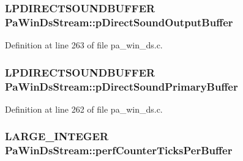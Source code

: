 \subsubsection[{\texorpdfstring{p\+Direct\+Sound\+Output\+Buffer}{pDirectSoundOutputBuffer}}]{\setlength{\rightskip}{0pt plus 5cm}L\+P\+D\+I\+R\+E\+C\+T\+S\+O\+U\+N\+D\+B\+U\+F\+F\+ER Pa\+Win\+Ds\+Stream\+::p\+Direct\+Sound\+Output\+Buffer}\hypertarget{struct_pa_win_ds_stream_a78946544af5046dd6ba8c723e849d1bb}{}\label{struct_pa_win_ds_stream_a78946544af5046dd6ba8c723e849d1bb}


Definition at line 263 of file pa\+\_\+win\+\_\+ds.\+c.

\subsubsection[{\texorpdfstring{p\+Direct\+Sound\+Primary\+Buffer}{pDirectSoundPrimaryBuffer}}]{\setlength{\rightskip}{0pt plus 5cm}L\+P\+D\+I\+R\+E\+C\+T\+S\+O\+U\+N\+D\+B\+U\+F\+F\+ER Pa\+Win\+Ds\+Stream\+::p\+Direct\+Sound\+Primary\+Buffer}\hypertarget{struct_pa_win_ds_stream_a722c711a49c112dd449a310021f6a434}{}\label{struct_pa_win_ds_stream_a722c711a49c112dd449a310021f6a434}


Definition at line 262 of file pa\+\_\+win\+\_\+ds.\+c.

\subsubsection[{\texorpdfstring{perf\+Counter\+Ticks\+Per\+Buffer}{perfCounterTicksPerBuffer}}]{\setlength{\rightskip}{0pt plus 5cm}L\+A\+R\+G\+E\+\_\+\+I\+N\+T\+E\+G\+ER Pa\+Win\+Ds\+Stream\+::perf\+Counter\+Ticks\+Per\+Buffer}\hypertarget{struct_pa_win_ds_stream_a039793c3d1d95db8711f1ae64a73ed9b}{}\label{struct_pa_win_ds_stream_a039793c3d1d95db8711f1ae64a73ed9b}


